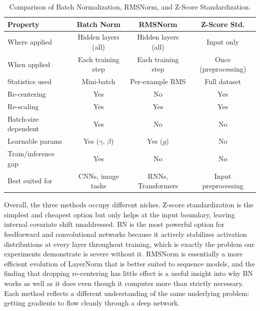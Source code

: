 \documentclass{article}
\begin{document}
\begin{table}[h]
  \caption{Comparison of Batch Normalization, RMSNorm, and Z-Score Standardization.}
  \label{tab:comparison}
  \centering
  \begin{tabular}{lccc}
    \toprule
    Property & Batch Norm & RMSNorm & Z-Score Std. \\
    \midrule
    Where applied       & Hidden layers (all) & Hidden layers (all) & Input only \\
    When applied        & Each training step  & Each training step  & Once (preprocessing) \\
    Statistics used     & Mini-batch          & Per-example RMS     & Full dataset \\
    Re-centering        & Yes                 & No                  & Yes \\
    Re-scaling          & Yes                 & Yes                 & Yes \\
    Batch-size dependent & Yes                & No                  & No \\
    Learnable params    & Yes ($\gamma$, $\beta$) & Yes ($g$)       & No \\
    Train/inference gap & Yes                 & No                  & No \\
    Best suited for     & CNNs, image tasks   & RNNs, Transformers  & Input preprocessing \\
    \bottomrule
  \end{tabular}
\end{table}

Overall, the three methods occupy different niches. Z-score standardization is the simplest
and cheapest option but only helps at the input boundary, leaving internal covariate shift
unaddressed. BN is the most powerful option for feedforward and convolutional networks because
it actively stabilizes activation distributions at every layer throughout training, which is
exactly the problem our experiments demonstrate is severe without it. RMSNorm is essentially
a more efficient evolution of LayerNorm that is better suited to sequence models, and the
finding that dropping re-centering has little effect is a useful insight into why BN works as
well as it does even though it computes more than strictly necessary. Each method reflects
a different understanding of the same underlying problem: getting gradients to flow cleanly
through a deep network.


\end{document}
